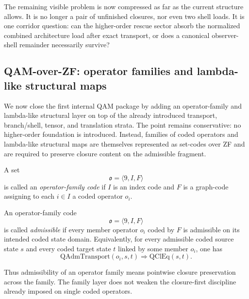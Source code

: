 \begin{remark}
The remaining visible problem is now compressed as far as the current structure allows. It is no longer a pair of unfinished closures, nor even two shell loads. It is one corridor question: can the higher-order rescue sector absorb the normalized combined architecture load after exact transport, or does a canonical observer-shell remainder necessarily survive?
\end{remark}



\subsection{QAM-over-ZF: operator families and lambda-like structural maps}

We now close the first internal QAM package by adding an operator-family and lambda-like structural layer on top of the already introduced transport, branch/shell, tensor, and translation strata. The point remains conservative: no higher-order foundation is introduced. Instead, families of coded operators and lambda-like structural maps are themselves represented as set-codes over ZF and are required to preserve closure content on the admissible fragment.

\begin{definition}
A set
\[
\mathfrak{o}=\langle 9,I,F\rangle
\]
is called an \emph{operator-family code} if $I$ is an index code and $F$ is a graph-code assigning to each $i\in I$ a coded operator $o_i$.
\end{definition}

\begin{definition}
An operator-family code
\[
\mathfrak{o}=\langle 9,I,F\rangle
\]
is called \emph{admissible} if every member operator $o_i$ coded by $F$ is admissible on its intended coded state domain. Equivalently, for every admissible coded source state $s$ and every coded target state $t$ linked by some member $o_i$, one has
\[
\mathrm{QAdmTransport}(o_i,s,t)
\Longrightarrow
\mathrm{QClEq}(s,t).
\]
\end{definition}

\begin{remark}
Thus admissibility of an operator family means pointwise closure preservation across the family. The family layer does not weaken the closure-first discipline already imposed on single coded operators.
\end{remark}

